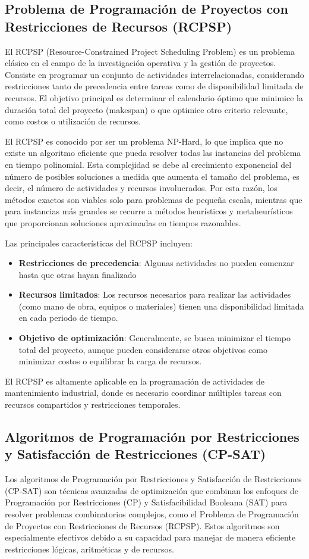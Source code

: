 \documentclass{article}
\begin{document}
\subsection{Problema de Programación de Proyectos con Restricciones de Recursos (RCPSP)}
El RCPSP (Resource-Constrained Project Scheduling Problem) es un problema clásico en el campo de la investigación operativa y la gestión de proyectos. Consiste en programar un conjunto de actividades interrelacionadas, considerando restricciones tanto de precedencia entre tareas como de disponibilidad limitada de recursos. El objetivo principal es determinar el calendario óptimo que minimice la duración total del proyecto (makespan) o que optimice otro criterio relevante, como costos o utilización de recursos.

El RCPSP es conocido por ser un problema NP-Hard, lo que implica que no existe un algoritmo eficiente que pueda resolver todas las instancias del problema en tiempo polinomial. Esta complejidad se debe al crecimiento exponencial del número de posibles soluciones a medida que aumenta el tamaño del problema, es decir, el número de actividades y recursos involucrados. Por esta razón, los métodos exactos son viables solo para problemas de pequeña escala, mientras que para instancias más grandes se recurre a métodos heurísticos y metaheurísticos que proporcionan soluciones aproximadas en tiempos razonables.

Las principales características del RCPSP incluyen:
\begin{itemize}
  \item \textbf{Restricciones de precedencia}: Algunas actividades no pueden comenzar hasta que otras hayan finalizado
  \item \textbf{Recursos limitados}: Los recursos necesarios para realizar las actividades (como mano de obra, equipos o materiales) tienen una disponibilidad limitada en cada periodo de tiempo.
  \item \textbf{Objetivo de optimización}: Generalmente, se busca minimizar el tiempo total del proyecto, aunque pueden considerarse otros objetivos como minimizar costos o equilibrar la carga de recursos.
\end{itemize}

El RCPSP es altamente aplicable en la programación de actividades de mantenimiento industrial, donde es necesario coordinar múltiples tareas con recursos compartidos y restricciones temporales.

\subsection{Algoritmos de Programación por Restricciones y Satisfacción de Restricciones (CP-SAT)}
Los algoritmos de Programación por Restricciones y Satisfacción de Restricciones (CP-SAT) son técnicas avanzadas de optimización que combinan los enfoques de Programación por Restricciones (CP) y Satisfacibilidad Booleana (SAT) para resolver problemas combinatorios complejos, como el Problema de Programación de Proyectos con Restricciones de Recursos (RCPSP). Estos algoritmos son especialmente efectivos debido a su capacidad para manejar de manera eficiente restricciones lógicas, aritméticas y de recursos.
\end{document}
